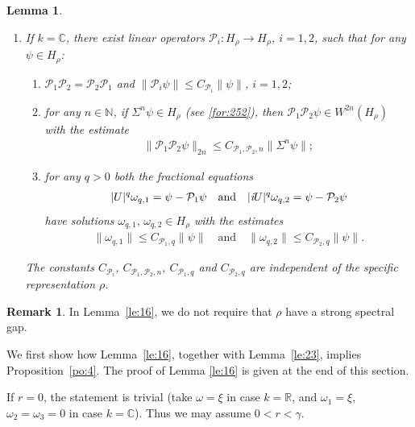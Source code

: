 \documentclass[11 pt]{amsart}
\newcommand{\NN}{\mathbb{N}}
\newcommand{\RR}{\mathbb{R}}
\newcommand{\CC}{\mathbb{C}}
\newcommand{\norm}[1]{\lVert#1\rVert}
\newtheorem{lemma}[theorem]{Lemma}
\theoremstyle{definition}
\newtheorem{remark}[theorem]{Remark}
\numberwithin{equation}{section}
\begin{document}
\begin{lemma}
\begin{enumerate}
\smallskip
  \item If $k=\CC$,  there exist linear operators
  $\mathcal{P}_i:H_\rho\to H_\rho$, $i=1,2$, such that for any $\psi\in H_\rho$:
\begin{enumerate}
  \item\label{for:255} $\mathcal{P}_1\mathcal{P}_2=\mathcal{P}_2\mathcal{P}_1$ and $\norm{\mathcal{P}_i\psi}\leq C_{\mathcal{P}_i}\norm{\psi}$, $i=1,2$;
  \item for any $n\in\NN$,  if $\Sigma^n\psi\in H_\rho$ (see \eqref{for:252}), then $\mathcal{P}_1\mathcal{P}_2\psi\in W^{2n}(H_\rho)$ with the estimate
  \begin{align*}
 \norm{\mathcal{P}_1\mathcal{P}_2\psi}_{2n}\leq C_{\mathcal{P}_1,\mathcal{P}_2,n}\big\|\Sigma^n\psi\big\|;
\end{align*}
 \item\label{for:249} for any $q>0$ both the fractional equations
 \begin{align*}
 |U|^q\omega_{q,1}=\psi-\mathcal{P}_1\psi\quad\text{and}\quad |\emph{i}U|^q\omega_{q,2}=\psi-\mathcal{P}_2\psi
 \end{align*}
 have solutions $\omega_{q,1},\,\omega_{q,2}\in H_\rho$ with the estimates
 \begin{align*}
 \|\omega_{q,1}\|\leq C_{\mathcal{P}_1,q}\norm{\psi}\quad\text{and}\quad \|\omega_{q,2}\|\leq C_{\mathcal{P}_2,q}\norm{\psi}.
 \end{align*}
\end{enumerate}
The constants $C_{\mathcal{P}_i}$, $C_{\mathcal{P}_1,\mathcal{P}_2,n}$,
  $C_{\mathcal{P}_1,q}$ and $C_{\mathcal{P}_2,q}$ are independent of the specific representation $\rho$.
\end{enumerate}
\end{lemma}
\begin{remark}
In Lemma~\ref{le:16}, we do not require that $\rho$ have a strong spectral gap.
\end{remark}
We first show how Lemma~\ref{le:16}, together with Lemma~\ref{le:23},
implies Proposition~\ref{po:4}.
The proof of Lemma \ref{le:16} is given at the end of this section.

If $r=0$, the statement is trivial (take $\omega=\xi$ in case $k=\RR$, and
$\omega_1=\xi$, $\omega_2=\omega_3=0$ in case $k=\CC$). Thus we may assume
$0<r<\gamma$.
\end{document}
